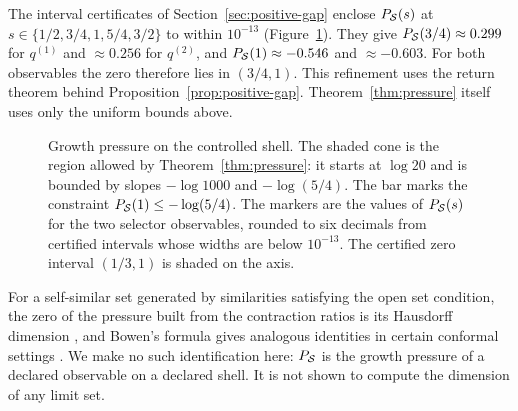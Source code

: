 \begin{remark}
The interval certificates of Section~\ref{sec:positive-gap} enclose $P_{\mathcal{S}}(s)$ at $s\in\{1/2,3/4,1,5/4,3/2\}$ to within $10^{-13}$ (Figure~\ref{fig:pressure}). They give $P_{\mathcal{S}}(3/4)\approx0.299$ for $q^{(1)}$ and $\approx0.256$ for $q^{(2)}$, and $P_{\mathcal{S}}(1)\approx-0.546$ and $\approx-0.603$. For both observables the zero therefore lies in $(3/4,1)$. This refinement uses the return theorem behind Proposition~\ref{prop:positive-gap}. Theorem~\ref{thm:pressure} itself uses only the uniform bounds above.
\end{remark}

\begin{figure}[t]
\centering

\caption{Growth pressure on the controlled shell. The shaded cone is the region allowed by Theorem~\ref{thm:pressure}: it starts at $\log 20$ and is bounded by slopes $-\log 1000$ and $-\log(5/4)$. The bar marks the constraint $P_{\mathcal{S}}(1)\le-\log(5/4)$. The markers are the values of $P_{\mathcal{S}}(s)$ for the two selector observables, rounded to six decimals from certified intervals whose widths are below $10^{-13}$. The certified zero interval $(1/3,1)$ is shaded on the axis.}
\label{fig:pressure}
\end{figure}

\begin{remark}
For a self-similar set generated by similarities satisfying the open set condition, the zero of the pressure built from the contraction ratios is its Hausdorff dimension \cite{Moran1946AdditiveFunctions,Hutchinson1981Fractals}, and Bowen's formula gives analogous identities in certain conformal settings \cite{Bowen1979Quasicircles}. We make no such identification here: $P_{\mathcal{S}}$ is the growth pressure of a declared observable on a declared shell. It is not shown to compute the dimension of any limit set.
\end{remark}
